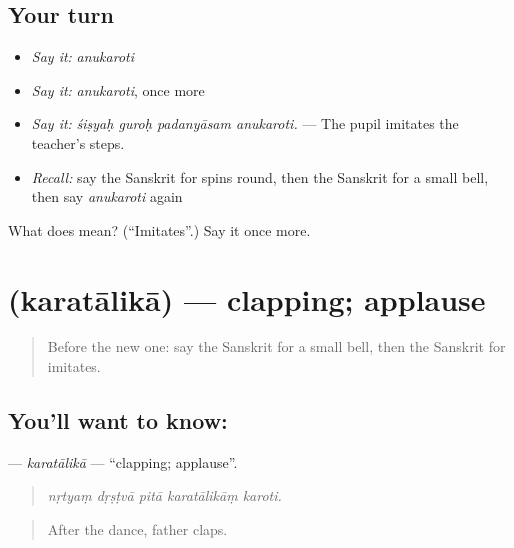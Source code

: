 \subsection*{Your turn}
\begin{itemize}
\raggedright
  \item \emph{Say it:} \emph{anukaroti}
  \item \emph{Say it:} \emph{anukaroti}, once more
  \item \emph{Say it:} \emph{śiṣyaḥ guroḥ padanyāsam anukaroti.} — The pupil imitates the teacher's steps.
  \item \emph{Recall:} say the Sanskrit for spins round, then the Sanskrit for a small bell, then say \emph{anukaroti} again
\end{itemize}

\begin{tcolorbox}[breakable,colback=teal!4,colframe=teal!35!black,title={Before you move on}]
What does  mean? (\textquotedblleft{}Imitates\textquotedblright{}.) Say it once more.
\end{tcolorbox}
\section[\texorpdfstring{\sk{करतालिका} (karatālikā)}{करतालिका (karatālikā)}]{ (karatālikā) — clapping; applause}

\label{lesson:SA-C522-karatalika}



\begin{quote}
Before the new one: say the Sanskrit for a small bell, then the Sanskrit for imitates.
\end{quote}

\subsection*{You'll want to know: }
\textbf{} — \emph{karatālikā} — \textquotedblleft{}clapping; applause\textquotedblright{}.

\begin{quote}
    
\end{quote}

\begin{quote}
\emph{nṛtyaṃ dṛṣṭvā pitā karatālikāṃ karoti.}
\end{quote}

\begin{quote}
After the dance, father claps.
\end{quote}

